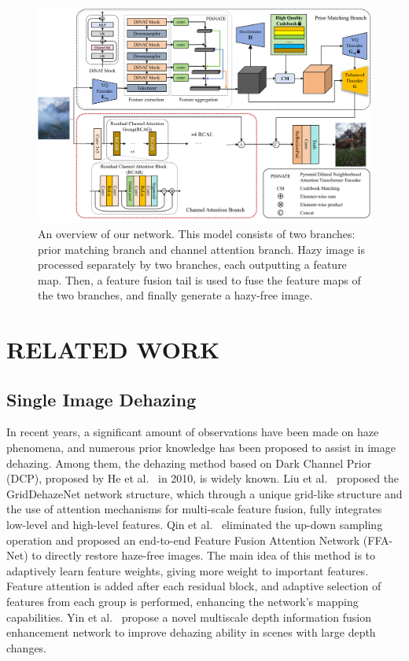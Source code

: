 \documentclass[lettersize,journal]{IEEEtran}
\begin{document}
\begin{figure}[!t]
	\centering
	\includegraphics[width=7in]{network_architecture}
	\caption{An overview of our network. This model consists of two branches: prior matching branch and channel attention branch. Hazy image is processed separately by two branches, each outputting a feature map. Then, a feature fusion tail is used to fuse the feature maps of the two branches, and finally generate a hazy-free image.}
	\label{fig0}
\end{figure}

\section{RELATED WORK}
\subsection{Single Image Dehazing}
In recent years, a significant amount of observations have been made on haze phenomena, and numerous prior knowledge has been proposed to assist in image dehazing. Among them, the dehazing method based on Dark Channel Prior (DCP), proposed by He et al.~\cite{he2010single} in 2010, is widely known. Liu et al.~\cite{liu2019griddehazenet} proposed the GridDehazeNet network structure, which through a unique grid-like structure and the use of attention mechanisms for multi-scale feature fusion, fully integrates low-level and high-level features. Qin et al.~\cite{qin2020ffa} eliminated the up-down sampling operation and proposed an end-to-end Feature Fusion Attention Network (FFA-Net) to directly restore haze-free images. The main idea of this method is to adaptively learn feature weights, giving more weight to important features. Feature attention is added after each residual block, and adaptive selection of features from each group is performed, enhancing the network's mapping capabilities. Yin et al.~\cite{yin2023multiscale} propose a novel multiscale depth information fusion enhancement network to improve dehazing ability in scenes with large depth changes. 
\end{document}
